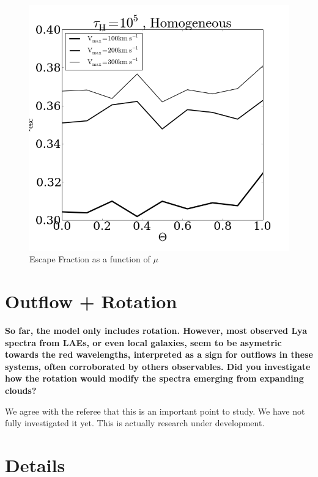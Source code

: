 \documentclass[12pt]{article}
\begin{document}
\begin{figure}
\begin{center}
\includegraphics[scale=0.5]{escapefractionvstheta.png}
\end{center}
\caption{Escape Fraction as a function of $\mu$
\label{escape_fraction}}
\end{figure}


\section*{Outflow + Rotation}

{\bf So far, the model only includes rotation. However, most observed
  Lya spectra from LAEs, or even local galaxies, seem to be asymetric
  towards the red wavelengths, interpreted as a sign for outflows in
  these systems, often corroborated by others observables. Did you
  investigate how the rotation would modify the spectra emerging from
  expanding clouds?} 


We agree with the referee that this is an important point to study. 
We have not fully investigated it yet.  This is actually research
under development.   

\section*{Details}
\end{document}
